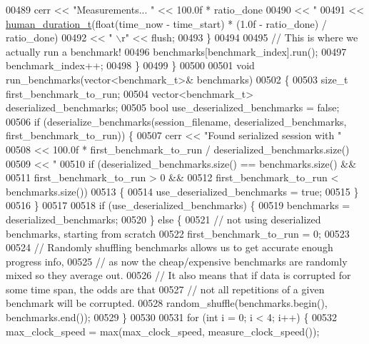 \begin{DoxyCode}
{{{{{00489       cerr << \textcolor{stringliteral}{"Measurements... "} << 100.0f * ratio\_done
00490            << \textcolor{stringliteral}{" %
00491            << \hyperlink{structhuman__duration__t}{human\_duration\_t}(\textcolor{keywordtype}{float}(time\_now - time\_start) * (1.0f - ratio\_done) / 
      ratio\_done)
00492            << \textcolor{stringliteral}{"                          \(\backslash\)r"} << flush;
00493     \}
00494 
00495     \textcolor{comment}{// This is where we actually run a benchmark!}
00496     benchmarks[benchmark\_index].run();
00497     benchmark\_index++;
00498   \}
00499 \}
00500 
00501 \textcolor{keywordtype}{void} run\_benchmarks(vector<benchmark\_t>& benchmarks)
00502 \{
00503   \textcolor{keywordtype}{size\_t} first\_benchmark\_to\_run;
00504   vector<benchmark\_t> deserialized\_benchmarks;
00505   \textcolor{keywordtype}{bool} use\_deserialized\_benchmarks = \textcolor{keyword}{false};
00506   \textcolor{keywordflow}{if} (deserialize\_benchmarks(session\_filename, deserialized\_benchmarks, first\_benchmark\_to\_run)) \{
00507     cerr << \textcolor{stringliteral}{"Found serialized session with "}
00508          << 100.0f * first\_benchmark\_to\_run / deserialized\_benchmarks.size()
00509          << \textcolor{stringliteral}{" %
00510     \textcolor{keywordflow}{if} (deserialized\_benchmarks.size() == benchmarks.size() &&
00511         first\_benchmark\_to\_run > 0 &&
00512         first\_benchmark\_to\_run < benchmarks.size())
00513     \{
00514       use\_deserialized\_benchmarks = \textcolor{keyword}{true};
00515     \}
00516   \}
00517 
00518   \textcolor{keywordflow}{if} (use\_deserialized\_benchmarks) \{
00519     benchmarks = deserialized\_benchmarks;
00520   \} \textcolor{keywordflow}{else} \{
00521     \textcolor{comment}{// not using deserialized benchmarks, starting from scratch}
00522     first\_benchmark\_to\_run = 0;
00523 
00524     \textcolor{comment}{// Randomly shuffling benchmarks allows us to get accurate enough progress info,}
00525     \textcolor{comment}{// as now the cheap/expensive benchmarks are randomly mixed so they average out.}
00526     \textcolor{comment}{// It also means that if data is corrupted for some time span, the odds are that}
00527     \textcolor{comment}{// not all repetitions of a given benchmark will be corrupted.}
00528     random\_shuffle(benchmarks.begin(), benchmarks.end());
00529   \}
00530 
00531   \textcolor{keywordflow}{for} (\textcolor{keywordtype}{int} i = 0; i < 4; i++) \{
00532     max\_clock\_speed = max(max\_clock\_speed, measure\_clock\_speed());
}}}}}}}
\end{DoxyCode}

